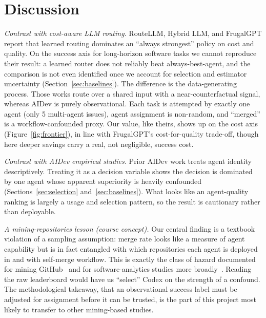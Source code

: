 \documentclass[sigconf,nonacm]{acmart}
\begin{document}
\section{Discussion}\label{sec:discussion}

\emph{Contrast with cost-aware LLM routing.} RouteLLM, Hybrid LLM, and FrugalGPT report that learned routing dominates an ``always strongest'' policy on cost and quality. On the success axis for long-horizon software tasks we cannot reproduce their result: a learned router does not reliably beat always-best-agent, and the comparison is not even identified once we account for selection and estimator uncertainty (Section~\ref{sec:baselines}). The difference is the data-generating process. Those works route over a shared input with a near-counterfactual signal, whereas AIDev is purely observational. Each task is attempted by exactly one agent (only 5 multi-agent issues), agent assignment is non-random, and ``merged'' is a workflow-confounded proxy. Our value, like theirs, shows up on the cost axis (Figure~\ref{fig:frontier}), in line with FrugalGPT's cost-for-quality trade-off, though here deeper savings carry a real, not negligible, success cost.

\emph{Contrast with AIDev empirical studies.} Prior AIDev work treats agent identity descriptively. Treating it as a decision variable shows the decision is dominated by one agent whose apparent superiority is heavily confounded (Sections~\ref{sec:selection} and~\ref{sec:baselines}). What looks like an agent-quality ranking is largely a usage and selection pattern, so the result is cautionary rather than deployable.

\emph{A mining-repositories lesson (course concept).} Our central finding is a textbook violation of a sampling assumption: merge rate looks like a measure of agent capability but is in fact entangled with which repositories each agent is deployed in and with self-merge workflow. This is exactly the class of hazard documented for mining GitHub~\cite{kalliamvakou2016promises} and for software-analytics studies more broadly~\cite{menzies2019badsmells}. Reading the raw leaderboard would have us ``select'' Codex on the strength of a confound. The methodological takeaway, that an observational success label must be adjusted for assignment before it can be trusted, is the part of this project most likely to transfer to other mining-based studies.
\end{document}
